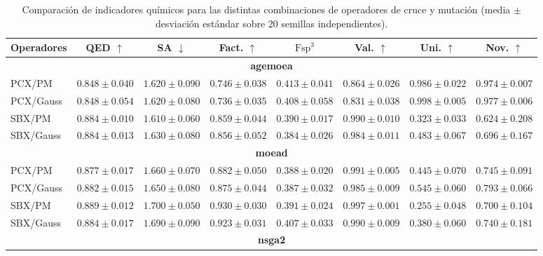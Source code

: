 \begin{table}[!htbp]
\centering
\caption{Comparación de indicadores químicos para las distintas combinaciones de operadores de cruce y mutación (media $\pm$ desviación estándar sobre 20 semillas independientes).}
\label{tab:comparison_chemical_operadores}%
\label{tab:comparison_chemical_agemoea}%
\label{tab:comparison_chemical_moead}%
\label{tab:comparison_chemical_nsga2}%
\label{tab:comparison_chemical_nsga3}
\begin{tabular}{lccccccc}
\toprule
Operadores & QED $\uparrow$ & SA $\downarrow$ & Fact. $\uparrow$ & $\text{Fsp}^3$ & Val. $\uparrow$ & Uni. $\uparrow$ & Nov. $\uparrow$ \\
\midrule
\multicolumn{8}{c}{\textbf{\acrshort{agemoea}}} \\
\cmidrule(lr){1-8}
PCX/PM & $0.848 \pm 0.040$ & $1.620 \pm 0.090$ & $0.746 \pm 0.038$ & $0.413 \pm 0.041$ & $0.864 \pm 0.026$ & $0.986 \pm 0.022$ & $0.974 \pm 0.007$ \\
PCX/Gauss & $0.848 \pm 0.054$ & $1.620 \pm 0.080$ & $0.736 \pm 0.035$ & $0.408 \pm 0.058$ & $0.831 \pm 0.038$ & $\mathbf{0.998 \pm 0.005}$ & $\mathbf{0.977 \pm 0.006}$ \\
SBX/PM & $\mathbf{0.884 \pm 0.010}$ & $\mathbf{1.610 \pm 0.060}$ & $\mathbf{0.859 \pm 0.044}$ & $0.390 \pm 0.017$ & $\mathbf{0.990 \pm 0.010}$ & $0.323 \pm 0.033$ & $0.624 \pm 0.208$ \\
SBX/Gauss & $0.884 \pm 0.013$ & $1.630 \pm 0.080$ & $0.856 \pm 0.052$ & $0.384 \pm 0.026$ & $0.984 \pm 0.011$ & $0.483 \pm 0.067$ & $0.696 \pm 0.167$ \\
\midrule
\multicolumn{8}{c}{\textbf{\acrshort{moead}}} \\
\cmidrule(lr){1-8}
PCX/PM & $0.877 \pm 0.017$ & $1.660 \pm 0.070$ & $0.882 \pm 0.050$ & $0.388 \pm 0.020$ & $0.991 \pm 0.005$ & $0.445 \pm 0.070$ & $0.745 \pm 0.091$ \\
PCX/Gauss & $0.882 \pm 0.015$ & $\mathbf{1.650 \pm 0.080}$ & $0.875 \pm 0.044$ & $0.387 \pm 0.032$ & $0.985 \pm 0.009$ & $\mathbf{0.545 \pm 0.060}$ & $\mathbf{0.793 \pm 0.066}$ \\
SBX/PM & $\mathbf{0.889 \pm 0.012}$ & $1.700 \pm 0.050$ & $\mathbf{0.930 \pm 0.030}$ & $0.391 \pm 0.024$ & $\mathbf{0.997 \pm 0.001}$ & $0.255 \pm 0.048$ & $0.700 \pm 0.104$ \\
SBX/Gauss & $0.884 \pm 0.017$ & $1.690 \pm 0.090$ & $0.923 \pm 0.031$ & $0.407 \pm 0.033$ & $0.990 \pm 0.009$ & $0.380 \pm 0.060$ & $0.740 \pm 0.181$ \\
\midrule
\multicolumn{8}{c}{\textbf{\acrshort{nsga2}}} \\

\end{tabular}
\end{table}
